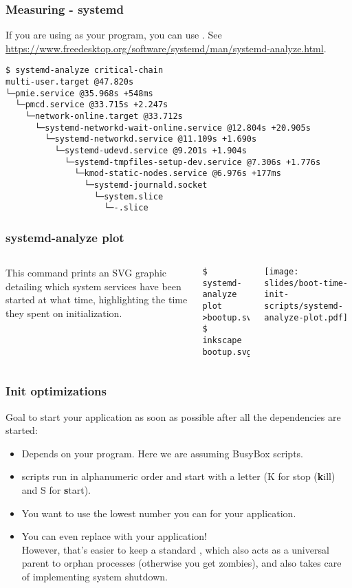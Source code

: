 \begin{frame}[fragile]
\frametitle{Measuring - systemd}
If you are using  as your  program, you can use
. See
\url{https://www.freedesktop.org/software/systemd/man/systemd-analyze.html}.\\
\begin{block}{}
\tiny
\begin{verbatim}
$ systemd-analyze critical-chain
multi-user.target @47.820s
└─pmie.service @35.968s +548ms
  └─pmcd.service @33.715s +2.247s
    └─network-online.target @33.712s
      └─systemd-networkd-wait-online.service @12.804s +20.905s
        └─systemd-networkd.service @11.109s +1.690s
          └─systemd-udevd.service @9.201s +1.904s
            └─systemd-tmpfiles-setup-dev.service @7.306s +1.776s
              └─kmod-static-nodes.service @6.976s +177ms
                └─systemd-journald.socket
                  └─system.slice
                    └─-.slice
\end{verbatim}
\end{block}
\end{frame}

\begin{frame}[fragile]
\frametitle{systemd-analyze plot}
\begin{columns}
This command prints an SVG graphic detailing which system services have been started at what time,
highlighting the time they spent on initialization.
\begin{verbatim}
$ systemd-analyze plot >bootup.svg
$ inkscape bootup.svg
\end{verbatim}
\texttt{[image: slides/boot-time-init-scripts/systemd-analyze-plot.pdf]}
\end{columns}
\end{frame}


\begin{frame}
\frametitle{Init optimizations}
Goal to start your application as soon as possible after all the dependencies are started:
\begin{itemize}
	\item Depends on your  program. Here we are assuming BusyBox
	       scripts.
	\item {} scripts run in alphanumeric order and start with
	      a letter (K for stop ({\bf k}ill) and S for {\bf s}tart).
	\item You want to use the lowest number you can for your application.
	\item You can even replace  with your application!\\
	      However, that's easier to keep a standard , which also
	      acts as a universal parent to orphan processes (otherwise
	      you get zombies), and also takes care of implementing system shutdown.
\end{itemize}
\end{frame}

